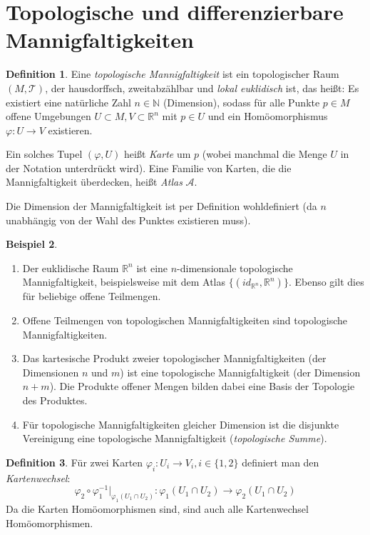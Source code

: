 \documentclass[a4paper]{scrbook}
\numberwithin{equation}{chapter}
\newcommand{\R}{\mathbb{R}}
\theoremstyle{definition}
\newtheorem{defn}{Definition}[section]
\newtheorem{bsp}[defn]{Beispiel}
\begin{document}
	\section{Topologische und differenzierbare Mannigfaltigkeiten}
		\begin{defn}
			Eine \emph{topologische Mannigfaltigkeit} ist ein topologischer Raum $(M,\mathcal{T})$, der hausdorffsch, zweitabzählbar und \emph{lokal euklidisch} ist, das heißt:
			Es existiert eine natürliche Zahl $n\in \mathbb{N}$ (Dimension), sodass für alle Punkte $p\in M$ offene Umgebungen $U\subset M, V\subset \R^n$ mit $p\in U $ und ein Homöomorphismus $ \varphi\colon U\rightarrow V$ existieren.

			Ein solches Tupel $(\varphi,U)$ heißt \emph{Karte} um $p$ (wobei manchmal die Menge $U$ in der Notation unterdrückt wird). Eine Familie von Karten, die die Mannigfaltigkeit überdecken, heißt \emph{Atlas} $\mathcal{A}$.

			Die Dimension der Mannigfaltigkeit ist per Definition wohldefiniert (da $n$ unabhängig von der Wahl des Punktes existieren muss).
		\end{defn}
		\begin{bsp}\hfill 
			\begin{enumerate}[label=(\alph*)]
				\item Der euklidische Raum $\R^n$ ist eine $n$-dimensionale topologische Mannigfaltigkeit, beispielsweise mit dem Atlas $\lbrace (id_{\R^n},\R^n)\rbrace$. Ebenso gilt dies für beliebige offene Teilmengen.
				\item Offene Teilmengen von topologischen Mannigfaltigkeiten sind topologische Mannigfaltigkeiten.
				\item Das kartesische Produkt zweier topologischer Mannigfaltigkeiten (der Dimensionen $n$ und $m$) ist eine topologische Mannigfaltigkeit (der Dimension $n + m$). Die Produkte offener Mengen bilden dabei eine Basis der Topologie des Produktes.
				\item Für topologische Mannigfaltigkeiten gleicher Dimension ist die disjunkte Vereinigung eine topologische Mannigfaltigkeit (\emph{topologische Summe}).
			\end{enumerate}
		\end{bsp}
		\begin{defn}
			Für zwei Karten $\varphi_i\colon U_i\rightarrow V_i, i\in\lbrace 1,2 \rbrace$ definiert man den \emph{Kartenwechsel}:
			\begin{equation*}
				\varphi_2\circ\varphi_1^{-1}\vert_{\varphi_1(U_1\cap U_2)}\colon \varphi_1(U_1\cap U_2)\rightarrow \varphi_2(U_1\cap U_2)
			\end{equation*}
			Da die Karten Homöomorphismen sind, sind auch alle Kartenwechsel Homöomorphismen.
		\end{defn} 
\end{document}
